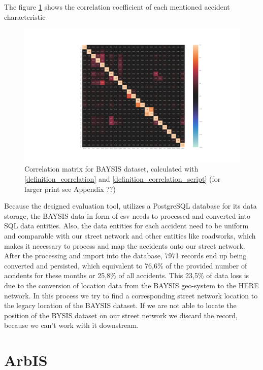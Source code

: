 \documentclass[a4paper,12pt]{report}
\begin{document}
The figure \ref{img:correlation_matrix_dataset} shows the correlation coefficient of each mentioned accident characteristic 

\begin{figure}[H]
	\centering
	\includegraphics[scale=0.2]{../CorrAnalysis/data/BAYSIS/01_dataset/plots/baysis_dataset_corr_theils}
	\caption{Correlation matrix for BAYSIS dataset, calculated with \ref{definition_correlation} and \ref{definition_correlation_script} (for larger print see Appendix ??)}
	\label{img:correlation_matrix_dataset}
\end{figure}

Because the designed evaluation tool, utilizes a PostgreSQL database for its data storage, the BAYSIS data in form of \acrfull{csv} needs to processed and converted into SQL data entities. Also, the data entities for each accident need to be uniform and comparable with our street network and other entities like roadworks, which makes it necessary to process and map the accidents onto our street network. After the processing and import into the database, 7971 records end up being converted and persisted, which equivalent to 76,6\% of the provided number of accidents for these months or 25,8\% of all accidents. This 23,5\% of data loss is due to the conversion of location data from the BAYSIS geo-system to the HERE network. In this process we try to find a corresponding street network location to the legacy location of the BAYSIS dataset. If we are not able to locate the position of the BYSIS dataset on our street network we discard the record, because we can’t work with it downstream. 

\section{ArbIS}
\label{dataset_arbis}
\end{document}
